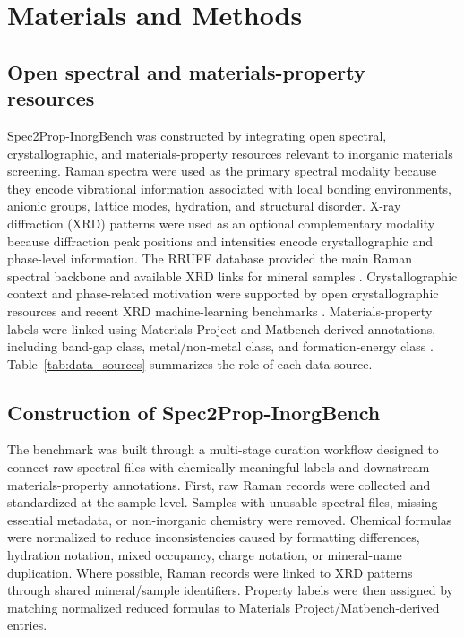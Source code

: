 \section{Materials and Methods}
\label{sec:methods}

\subsection{Open spectral and materials-property resources}
\label{subsec:data_sources}

Spec2Prop-InorgBench was constructed by integrating open spectral, crystallographic, and materials-property resources relevant to inorganic materials screening. Raman spectra were used as the primary spectral modality because they encode vibrational information associated with local bonding environments, anionic groups, lattice modes, hydration, and structural disorder. X-ray diffraction (XRD) patterns were used as an optional complementary modality because diffraction peak positions and intensities encode crystallographic and phase-level information. The RRUFF database provided the main Raman spectral backbone and available XRD links for mineral samples \cite{lafuente2015rruff,downs2006rruff}. Crystallographic context and phase-related motivation were supported by open crystallographic resources and recent XRD machine-learning benchmarks \cite{grazulis2009cod,grazulis2012cod,rincon2025simpod,guo2024xrddeeplearning}. Materials-property labels were linked using Materials Project and Matbench-derived annotations, including band-gap class, metal/non-metal class, and formation-energy class \cite{jain2013materialsproject,dunn2020matbench,riebesell2025matbenchdiscovery}. Table~\ref{tab:data_sources} summarizes the role of each data source.



\subsection{Construction of Spec2Prop-InorgBench}
\label{subsec:dataset_construction}

The benchmark was built through a multi-stage curation workflow designed to connect raw spectral files with chemically meaningful labels and downstream materials-property annotations. First, raw Raman records were collected and standardized at the sample level. Samples with unusable spectral files, missing essential metadata, or non-inorganic chemistry were removed. Chemical formulas were normalized to reduce inconsistencies caused by formatting differences, hydration notation, mixed occupancy, charge notation, or mineral-name duplication. Where possible, Raman records were linked to XRD patterns through shared mineral/sample identifiers. Property labels were then assigned by matching normalized reduced formulas to Materials Project/Matbench-derived entries.

